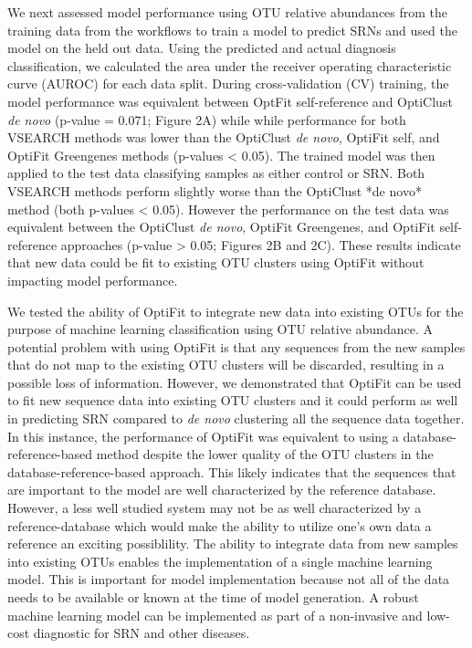 \documentclass[
]{article}
\begin{document}
We next assessed model performance using OTU relative abundances from
the training data from the workflows to train a model to predict SRNs
and used the model on the held out data. Using the predicted and actual
diagnosis classification, we calculated the area under the receiver
operating characteristic curve (AUROC) for each data split. During
cross-validation (CV) training, the model performance was equivalent
between OptFit self-reference and OptiClust \emph{de novo} (p-value =
0.071; Figure 2A) while while performance for both VSEARCH methods was
lower than the OptiClust \emph{de novo}, OptiFit self, and OptiFit
Greengenes methods (p-values \textless{} 0.05). The trained model was
then applied to the test data classifying samples as either control or
SRN. Both VSEARCH methods perform slightly worse than the OptiClust *de
novo* method (both p-values \textless{} 0.05). However the performance
on the test data was equivalent between the OptiClust \emph{de novo},
OptiFit Greengenes, and OptiFit self-reference approaches (p-value
\textgreater{} 0.05; Figures 2B and 2C). These results indicate that new
data could be fit to existing OTU clusters using OptiFit without
impacting model performance.

We tested the ability of OptiFit to integrate new data into existing
OTUs for the purpose of machine learning classification using OTU
relative abundance. A potential problem with using OptiFit is that any
sequences from the new samples that do not map to the existing OTU
clusters will be discarded, resulting in a possible loss of information.
However, we demonstrated that OptiFit can be used to fit new sequence
data into existing OTU clusters and it could perform as well in
predicting SRN compared to \emph{de novo} clustering all the sequence
data together. In this instance, the performance of OptiFit was
equivalent to using a database-reference-based method despite the lower
quality of the OTU clusters in the database-reference-based approach.
This likely indicates that the sequences that are important to the model
are well characterized by the reference database. However, a less well
studied system may not be as well characterized by a reference-database
which would make the ability to utilize one's own data a reference an
exciting possiblility. The ability to integrate data from new samples
into existing OTUs enables the implementation of a single machine
learning model. This is important for model implementation because not
all of the data needs to be available or known at the time of model
generation. A robust machine learning model can be implemented as part
of a non-invasive and low-cost diagnostic for SRN and other diseases.
\end{document}
